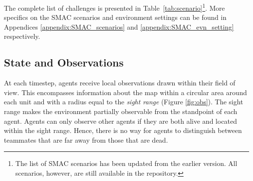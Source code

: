 The complete list of challenges is presented in Table~\ref{tab:scenario}\footnote{The list of SMAC scenarios has been updated from the earlier version. All scenarios, however, are still available in the repository.}. More specifics on the SMAC scenarios and environment settings can be found in Appendices \ref{appendix:SMAC_scenarios} and \ref{appendix:SMAC_evn_setting} respectively.

\begin{table}
	\caption{SMAC challenges.}
	\label{tab:scenario}
	\vspace{-.3cm}
\end{table}

\subsection*{State and Observations}\label{section:state_and_obs}
At each timestep, agents receive local observations drawn within their field of view. This encompasses information about the map within a circular area around each unit and with a radius equal to the \textit{sight range} (Figure \ref{fig:obs}). The sight range makes the environment partially observable from the standpoint of each agent. Agents can only observe other agents if they are both alive and located within the sight range. Hence, there is no way for agents to distinguish between teammates that are far away from those that are dead.

